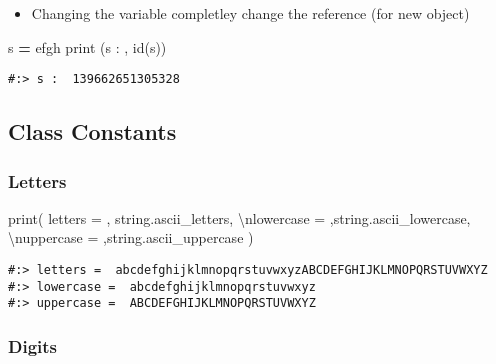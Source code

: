 \documentclass[
]{book}
\newenvironment{Shaded}{\begin{snugshade}}{\end{snugshade}}
\newcommand{\BuiltInTok}[1]{#1}
\newcommand{\CharTok}[1]{\textcolor[rgb]{0.5,0.5,0.5}{#1}}
\newcommand{\NormalTok}[1]{#1}
\newcommand{\OperatorTok}[1]{\textcolor[rgb]{0.43,0.43,0.43}{\textbf{#1}}}
\newcommand{\StringTok}[1]{\textcolor[rgb]{0.5,0.5,0.5}{#1}}
\providecommand{\tightlist}{%
  \setlength{\itemsep}{0pt}\setlength{\parskip}{0pt}}
\begin{document}
\begin{itemize}
\tightlist
\item
  Changing the variable completley change the reference (for new object)
\end{itemize}

\begin{Shaded}
\begin{Highlighting}[]
\NormalTok{s }\OperatorTok{=} \StringTok{\textquotesingle{}efgh\textquotesingle{}}
\BuiltInTok{print}\NormalTok{ (}\StringTok{\textquotesingle{}s : \textquotesingle{}}\NormalTok{, }\BuiltInTok{id}\NormalTok{(s))}
\end{Highlighting}
\end{Shaded}

\begin{verbatim}
#:> s :  139662651305328
\end{verbatim}

\hypertarget{class-constants}{%
\subsection{Class Constants}\label{class-constants}}

\hypertarget{letters}{%
\subsubsection{Letters}\label{letters}}

\begin{Shaded}
\begin{Highlighting}[]
\BuiltInTok{print}\NormalTok{( }\StringTok{\textquotesingle{}letters = \textquotesingle{}}\NormalTok{, string.ascii\_letters,}
        \StringTok{\textquotesingle{}}\CharTok{\textbackslash{}n}\StringTok{lowercase = \textquotesingle{}}\NormalTok{,string.ascii\_lowercase,}
        \StringTok{\textquotesingle{}}\CharTok{\textbackslash{}n}\StringTok{uppercase = \textquotesingle{}}\NormalTok{,string.ascii\_uppercase )}
\end{Highlighting}
\end{Shaded}

\begin{verbatim}
#:> letters =  abcdefghijklmnopqrstuvwxyzABCDEFGHIJKLMNOPQRSTUVWXYZ 
#:> lowercase =  abcdefghijklmnopqrstuvwxyz 
#:> uppercase =  ABCDEFGHIJKLMNOPQRSTUVWXYZ
\end{verbatim}

\hypertarget{digits}{%
\subsubsection{Digits}\label{digits}}
\end{document}
